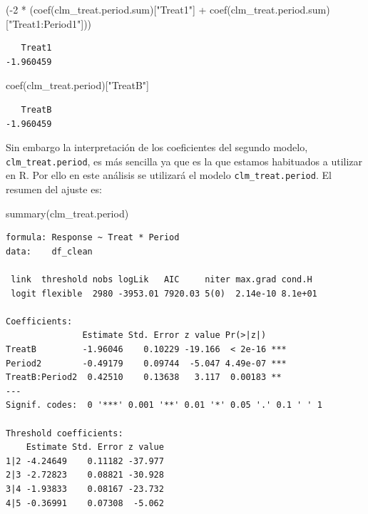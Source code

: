 \documentclass[
  12pt,
  a4paper,
  extrafontsizes,
  onecolumn,
  openright]{memoir}
\newenvironment{Shaded}{\begin{snugshade}}{\end{snugshade}}
\newcommand{\DecValTok}[1]{\textcolor[rgb]{0.68,0.00,0.00}{#1}}
\newcommand{\FunctionTok}[1]{\textcolor[rgb]{0.28,0.35,0.67}{#1}}
\newcommand{\NormalTok}[1]{\textcolor[rgb]{0.00,0.23,0.31}{#1}}
\newcommand{\SpecialCharTok}[1]{\textcolor[rgb]{0.37,0.37,0.37}{#1}}
\newcommand{\StringTok}[1]{\textcolor[rgb]{0.13,0.47,0.30}{#1}}
\begin{document}
\scriptsize

\begin{Shaded}
\begin{Highlighting}[]
\NormalTok{(}\SpecialCharTok{{-}}\DecValTok{2} \SpecialCharTok{*}\NormalTok{ (}\FunctionTok{coef}\NormalTok{(clm\_treat.period.sum)[}\StringTok{"Treat1"}\NormalTok{] }\SpecialCharTok{+} \FunctionTok{coef}\NormalTok{(clm\_treat.period.sum)[}\StringTok{"Treat1:Period1"}\NormalTok{]))}
\end{Highlighting}
\end{Shaded}

\begin{verbatim}
   Treat1 
-1.960459 
\end{verbatim}

\begin{Shaded}
\begin{Highlighting}[]
\FunctionTok{coef}\NormalTok{(clm\_treat.period)[}\StringTok{"TreatB"}\NormalTok{]}
\end{Highlighting}
\end{Shaded}

\begin{verbatim}
   TreatB 
-1.960459 
\end{verbatim}

\normalsize

Sin embargo la interpretación de los coeficientes del segundo modelo,
\texttt{clm\_treat.period}, es más sencilla ya que es la que estamos
habituados a utilizar en R. Por ello en este análisis se utilizará el
modelo \texttt{clm\_treat.period}. El resumen del ajuste es:

\scriptsize

\begin{Shaded}
\begin{Highlighting}[]
\FunctionTok{summary}\NormalTok{(clm\_treat.period)}
\end{Highlighting}
\end{Shaded}

\begin{verbatim}
formula: Response ~ Treat * Period
data:    df_clean

 link  threshold nobs logLik   AIC     niter max.grad cond.H 
 logit flexible  2980 -3953.01 7920.03 5(0)  2.14e-10 8.1e+01

Coefficients:
               Estimate Std. Error z value Pr(>|z|)    
TreatB         -1.96046    0.10229 -19.166  < 2e-16 ***
Period2        -0.49179    0.09744  -5.047 4.49e-07 ***
TreatB:Period2  0.42510    0.13638   3.117  0.00183 ** 
---
Signif. codes:  0 '***' 0.001 '**' 0.01 '*' 0.05 '.' 0.1 ' ' 1

Threshold coefficients:
    Estimate Std. Error z value
1|2 -4.24649    0.11182 -37.977
2|3 -2.72823    0.08821 -30.928
3|4 -1.93833    0.08167 -23.732
4|5 -0.36991    0.07308  -5.062
\end{verbatim}
\end{document}
